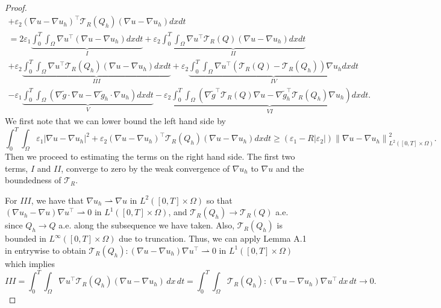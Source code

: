 \documentclass[10pt,letterpaper]{amsart}
\newcommand\norm[1]{\left\lVert#1\right\rVert}
\newcommand{\Grad}{\nabla}
\newcommand{\T}{\mathcal T}
\theoremstyle{definition}{\newtheorem{definition}[lemma]{Definition}}
\theoremstyle{note}{\newtheorem{claim}{Claim}[section]
\newtheorem*{claim*}{Claim}}
\numberwithin{equation}{section}
\begin{document}
\begin{proof}
\begin{multline}
+\varepsilon_2(\nabla u - \nabla u_h)^\top \T_R(Q_h)(\nabla u-\nabla u_h)dx dt\\
=2\varepsilon_1\underbrace{\int_0^T\int_\Omega  \nabla u^\top(\nabla u - \nabla u_h) dx dt}_{I}+\varepsilon_2\underbrace{\int_0^T\int_\Omega \nabla u^\top \T_R(Q)(\nabla u-\nabla u_h)  dx dt}_{II}\\
+\varepsilon_2\underbrace{\int_0^T\int_\Omega  \nabla u^\top \T_R(Q_h)(\nabla u-\nabla u_h) dx dt}_{III} +\varepsilon_2\underbrace{\int_0^T\int_\Omega \nabla u^\top(\T_R(Q)-\T_R(Q_h))\nabla u_h dxdt}_{IV}
\\ 
- \varepsilon_1\underbrace{\int_0^T\int_\Omega (\nabla\tilde g\cdot\nabla u - \nabla\tilde g_h\cdot\nabla u_h)dx dt}_{V} - \varepsilon_2\underbrace{\int_0^T\int_\Omega(\nabla\tilde g^\top \T_R(Q)\nabla u - \nabla\tilde g_h^\top\T_R(Q_h)\nabla u_h)dx dt}_{VI}.
\end{multline}
We first note that we can lower bound the left hand side by 
\begin{equation}\label{eq:u_strong_convergence_lhs_bound}
\int_0^T\int_\Omega \varepsilon_1\lvert \nabla u - \nabla u_h\rvert^2
+\varepsilon_2(\nabla u - \nabla u_h)^\top \T_R(Q_h)(\nabla u-\nabla u_h)dx dt\geq (\varepsilon_1-R|\varepsilon_2|)\norm{\Grad u - \Grad u_h}_{L^2([0,T]\times\Omega)}^2.
\end{equation}
Then we proceed to estimating the terms on the right hand side. The first two terms, $I$ and $II$, converge to zero by the weak convergence of $\Grad u_h$ to $\Grad u$ and the boundedness of $\T_R$. 

For $III$, we have that $\Grad u_h\rightharpoonup\Grad u$ in $L^2([0,T]\times\Omega)$ so that $(\Grad u_h-\Grad u)\Grad u^\top\rightharpoonup 0$ in $L^1([0,T]\times\Omega)$, and $\T_R(Q_h)\to\T_R(Q)$ a.e. since $Q_h\to Q$ a.e. along the subsequence we have taken. Also, $\T_R(Q_h)$ is bounded in $L^\infty([0,T]\times\Omega)$ due to truncation. Thus, we can apply Lemma A.1 in \cite{weber2021convergent} entrywise to obtain $\T_R(Q_h):(\nabla u-\nabla u_h)\nabla u^\top\rightharpoonup 0$ in $L^1([0,T]\times\Omega)$ which implies
\[
III=\int_0^T\int_\Omega \nabla u^\top \T_R(Q_h)(\nabla u-\nabla u_h)\, dx\, dt  = \int_0^T\int_\Omega \T_R(Q_h):(\nabla u-\nabla u_h)\nabla u^\top\, dx\, dt \to 0.
\]


\end{proof}
\end{document}

